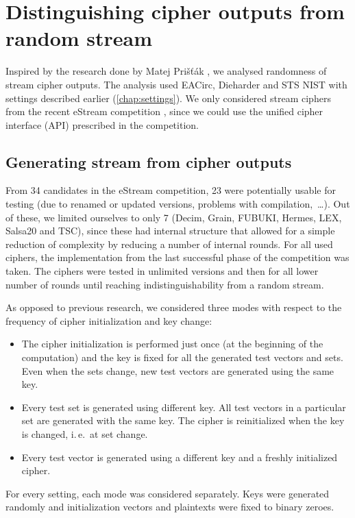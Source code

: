 \documentclass[12pt,twoside]{fithesis2}		%
\renewcommand{\_}{\leavevmode \kern0.0em\vbox{\hrule width0.4em}}
\newcommand{\squarebullet}{\textcolor{black}{\raisebox{0.15em}{\rule{4pt}{4pt}}}}
\newenvironment{myItemize}{
  \begin{itemize}[leftmargin=2em,rightmargin=1em,itemsep=\parskip ,parsep=0em,topsep=0em,partopsep=0em]
  \renewcommand{\labelitemi}{\squarebullet}
  \renewcommand{\labelitemii}{$\diamond$}
}{
  \end{itemize}
}
\begin{document}
\chapter{Distinguishing cipher outputs from random stream}
\label{chap:distinguish-cipher}

Inspired by the research done by Matej Prišťák \parencite{thesis-pristak}, we analysed randomness of stream cipher outputs.
The analysis used EACirc, Dieharder and STS NIST with settings described earlier (\autoref{chap:settings}).
We only considered stream ciphers from the recent eStream competition \parencite{estream-competition},
since we could use the unified cipher interface (API) prescribed in the competition.

\section{Generating stream from cipher outputs}
\label{sec:estream-settings}

From 34 candidates in the eStream competition, 23 were potentially usable for testing (due to renamed or updated versions, 
problems with compilation,~\dots). Out of these, we limited ourselves to only 7 (Decim, Grain, FUBUKI, Hermes, LEX, Salsa20 and TSC),
since these had internal structure that allowed for a simple reduction of complexity by reducing a number of internal rounds.
For all used ciphers, the implementation from the last successful phase of the competition was taken. 
The ciphers were tested in unlimited versions
and then for all lower number of rounds until reaching indistinguishability from a random stream.

As opposed to previous research, we considered three modes with respect to the frequency of cipher initialization and key change:
\begin{myItemize}
\item The cipher initialization is performed just once (at the beginning of the computation) and the key is fixed for
all the generated test vectors and sets. Even when the sets change, new test vectors are generated using the same key.
\item Every test set is generated using different key. All test vectors in a particular set are generated with the same key.
The cipher is reinitialized when the key is changed, i.\,e.\ at set change.
\item Every test vector is generated using a different key and a freshly initialized cipher.
\end{myItemize}
For every setting, each mode was considered separately. Keys were generated randomly and initialization vectors and plaintexts
were fixed to binary zeroes.
\end{document}
